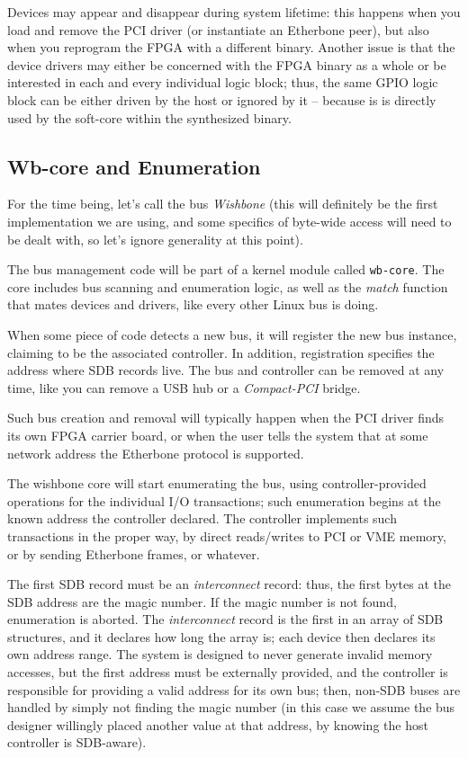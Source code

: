 \documentclass[a4paper, 12pt]{article}
\begin{document}
Devices may appear and disappear during system lifetime: this happens
when you load and remove the PCI driver (or instantiate an Etherbone
peer), but also when you reprogram the FPGA with a different binary.
Another issue is that the device drivers may either be concerned with the FPGA
binary as a whole or be interested in each and every  individual logic block;
thus, the same
GPIO logic block can be either driven by the host or ignored by it -- because
is is directly used by the soft-core within the synthesized binary.

\subsection{Wb-core and Enumeration}

For the time being, let's call the bus \textit{Wishbone} (this will
definitely be the first implementation we are using, and some specifics
of byte-wide access will need to be dealt with, so let's ignore
generality at this point).

The bus management code will be part of a kernel module called
\texttt{wb-core}. The core includes bus scanning and enumeration
logic, as well as the \textit{match} function that mates devices and
drivers, like every other Linux bus is doing.

When some piece of code detects a new bus, it will register the new
bus instance, claiming to be the associated controller.  In addition,
registration specifies the address where SDB records live. The bus and
controller can be removed at any time, like you can remove a USB hub
or a \textit{Compact-PCI} bridge.

Such bus creation and removal will typically happen when the PCI
driver finds its own FPGA carrier board, or when the user tells the system
that at some network address the Etherbone protocol is
supported.

The wishbone core will start enumerating the bus, using
controller-provided operations for the individual I/O transactions;
such enumeration begins at the known address the controller declared.
The controller implements such transactions in the proper way, by
direct reads/writes to PCI or VME memory, or by sending Etherbone frames,
or whatever.

The first SDB record must be an \textit{interconnect} record: thus,
the first bytes at the SDB address are the magic number. If the magic number is not found,
enumeration is aborted.  The \textit{interconnect} record is the first
in an array of SDB structures, and it declares how long the array is;
each device then declares its own address range.  The system is
designed to never generate invalid memory accesses, but the first
address must be externally provided, and the controller is responsible
for providing a valid address for its own bus; then, non-SDB buses are
handled by simply not finding the magic number (in this case we assume
the bus designer willingly placed another value at that address, by
knowing the host controller is SDB-aware).
\end{document}

